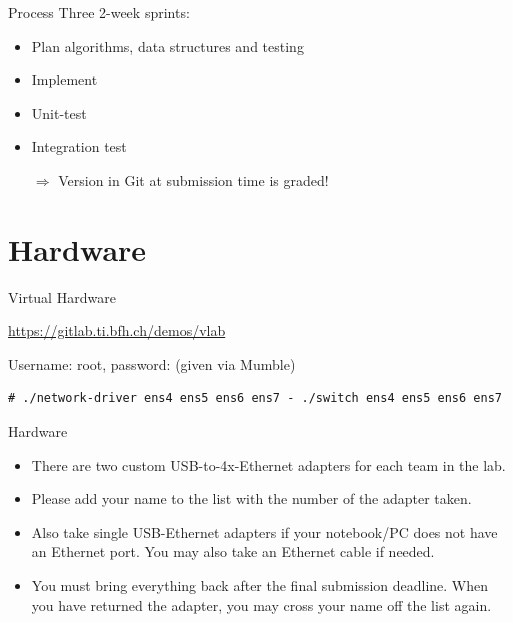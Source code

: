 \documentclass{beamer}
\begin{document}
\begin{frame}{Process}
Three 2-week sprints:
\begin{itemize}
\item Plan algorithms, data structures and testing
\item Implement
\item Unit-test
\item Integration test
\item[$\Rightarrow$] Version in Git at submission time is graded!
\end{itemize}
\end{frame}


\section{Hardware}

\begin{frame}[fragile]{Virtual Hardware}
  \vfill
  \begin{center}
    \url{https://gitlab.ti.bfh.ch/demos/vlab}
  \end{center}
  \vfill
  \begin{center}
    Username: root, password: (given via Mumble) %
  \end{center}
  \vfill
{\tiny
\begin{verbatim}
# ./network-driver ens4 ens5 ens6 ens7 - ./switch ens4 ens5 ens6 ens7
\end{verbatim}
}
\end{frame}


\begin{frame}{Hardware}
\begin{itemize}
\item There are two custom USB-to-4x-Ethernet adapters for each
      team in the lab.
\item Please
      add your name to the list with the number of the adapter taken.
\item Also take single USB-Ethernet adapters if your notebook/PC
      does not have an Ethernet port. You may also take an
      Ethernet cable if needed.
\item You must bring everything back after the final submission
      deadline. When you have returned the adapter, you may cross your
      name off the list again.
\end{itemize}
\end{frame}
\end{document}
